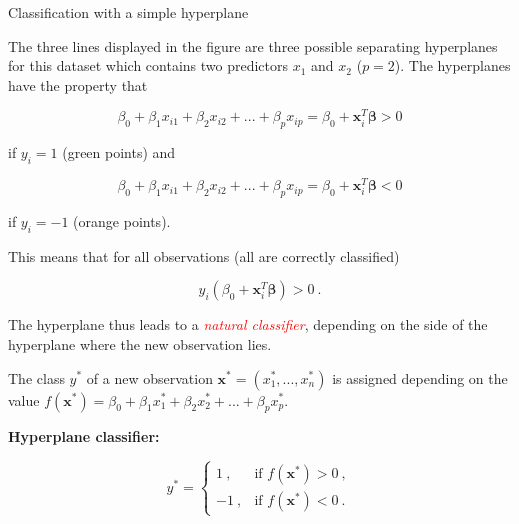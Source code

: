 \documentclass[10pt,ignorenonframetext,]{beamer}
\begin{document}
\begin{frame}

\begin{block}{Classification with a simple hyperplane}

\vspace{2mm}

The three lines displayed in the figure are three possible separating
hyperplanes for this dataset which contains two predictors \(x_1\) and
\(x_2\) (\(p=2\)). The hyperplanes have the property that

\[\beta_0+\beta_1 x_{i1} + \beta_2 x_{i2}+...+\beta_p x_{ip}=\beta_0+{\boldsymbol x}_i^T {\boldsymbol \beta}>0\]

if \(y_i=1\) (green points) and

\[\beta_0+\beta_1 x_{i1} + \beta_2 x_{i2}+...+\beta_p x_{ip}=\beta_0+{\boldsymbol x}_i^T {\boldsymbol \beta}<0\]

if \(y_i=-1\) (orange points).

\end{block}

\end{frame}

\begin{frame}

This means that for all observations (all are correctly classified)

\[y_i (\beta_0+{\boldsymbol x}_i^T {\boldsymbol \beta})>0 \ .\]

\vspace{2mm}

The hyperplane thus leads to a
\emph{\textcolor{red}{natural classifier}}, depending on the side of the
hyperplane where the new observation lies.

The class \(y^*\) of a new observation
\({\boldsymbol x}^*=(x_1^*,...,x_n^*)\) is assigned depending on the
value
\(f({\boldsymbol x}^*)=\beta_0+\beta_1 x_1^* + \beta_2 x_{2}^*+...+\beta_p x_{p}^*.\)

\vspace{2mm}

\textbf{Hyperplane classifier:}

\[y^* = \left\{ \begin{array}{ll}
1 \ , & \text{if } f({\boldsymbol x}^*) >0 \ ,\\
-1 \ , & \text{if } f({\boldsymbol x}^*) < 0 \ .
\end{array}\right.\]

\end{frame}
\end{document}
